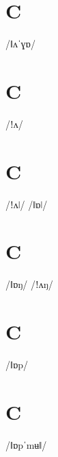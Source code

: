 \documentclass[10pt,a4paper,twoside]{book}
\begin{document}
\section*{C}

\begin{multicols}{3}
 {/ǁʌˈɣɒ/} {}
\end{multicols}

\section*{C}

\begin{multicols}{3}
 {/ǃʌ/} {}
\end{multicols}

\section*{C}

\begin{multicols}{3}
 {/ǃʌǀ/} {}
 {/ǁɒǀ/} {}
\end{multicols}

\section*{C}

\begin{multicols}{3}
 {/ǁɒŋ/} {}
 {/ǃʌŋ/} {}
\end{multicols}

\section*{C}

\begin{multicols}{3}
 {/ǁɒp/} {}
\end{multicols}

\section*{C}

\begin{multicols}{3}
 {/ǁɒpˈmʉǁ/} {}
\end{multicols}
\end{document}
